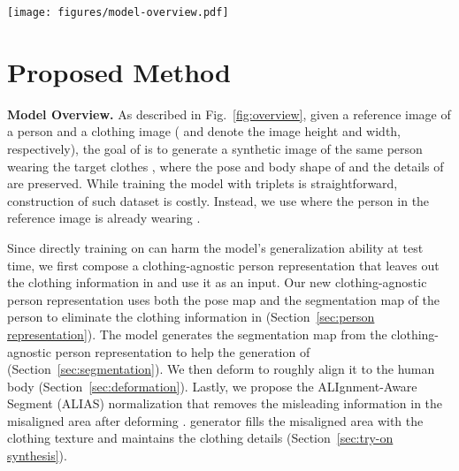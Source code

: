 \begin{figure*}[t!]
    \centering
    \texttt{[image: figures/model-overview.pdf]}
    \vspace{-0.5cm}
    \caption{Overview of a \model. (a) First, given a reference image  containing a target person, we predict the segmentation map  and the pose map , and utilize them to pre-process  and  as a clothing-agnostic person image  and segmentation . (b) Segmentation generator produces the synthetic segmentation  from . (c) Geometric matching module deforms the clothing image  according to the predicted clothing segmentation  extracted from . (d) Finally, \norm generator synthesizes the final output image  based on the outputs from the previous stages via our \norm normalization.}
    \vspace{-0.4cm}
    \label{fig:overview}
\end{figure*}

\section{Proposed Method}
\textbf{Model Overview.}
As described in Fig.~\ref{fig:overview}, given a reference image  of a person and a clothing image  ( and  denote the image height and width, respectively), the goal of \model is to generate a synthetic image  of the same person wearing the target clothes , where the pose and body shape of  and the details of  are preserved.
While training the model with  triplets is straightforward, construction of such dataset is costly.
Instead, we use  where the person in the reference image  is already wearing .

Since directly training on  can harm the model's generalization ability at test time, we first compose a clothing-agnostic person representation that leaves out the clothing information in  and use it as an input.
Our new clothing-agnostic person representation uses both the pose map and the segmentation map of the person to eliminate the clothing information in  (Section~\ref{sec:person representation}).
The model generates the segmentation map from the clothing-agnostic person representation to help the generation of  (Section~\ref{sec:segmentation}).
We then deform  to roughly align it to the human body (Section~\ref{sec:deformation}).
Lastly, we propose the ALIgnment-Aware Segment (ALIAS) normalization that removes the misleading information in the misaligned area after deforming .
\norm generator fills the misaligned area with the clothing texture and maintains the clothing details (Section~\ref{sec:try-on synthesis}).

